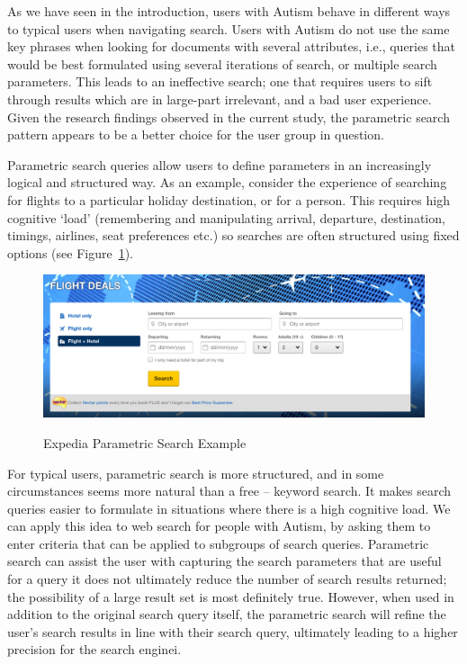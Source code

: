 \documentclass[a4paper, 11pt]{article}
\begin{document}
As we have seen in the introduction, users with Autism behave in different ways to typical users when navigating search. Users with Autism do not use the same key phrases when looking for documents with several attributes, i.e., queries that would be best formulated using several iterations of search, or multiple search parameters. This leads to an ineffective search; one that requires users to sift through results which are in large-part irrelevant, and a bad user experience. Given the research findings observed in the current study, the parametric search pattern appears to be a better choice for the user group in question.  

Parametric search queries allow users to define parameters in an increasingly logical and structured way. As an example, consider the experience of searching for flights to a particular holiday destination, or for a person. This requires high cognitive ‘load’ (remembering and manipulating arrival, departure, destination, timings, airlines, seat preferences etc.) so searches are often structured using fixed options (see Figure~\ref{exped}).

\begin{figure}[H]
\begin{center}
\includegraphics[scale=0.3]{expedia}\\

\caption{Expedia Parametric Search Example}
\label{exped}
\end{center}
\end{figure}

For typical users, parametric search is more structured, and in some circumstances seems more natural than a free – keyword search. It makes search queries easier to formulate in situations where there is a high cognitive load.  We can apply this idea to web search for people with Autism, by asking them to enter criteria that can be applied to subgroups of search queries. Parametric search can assist the user with capturing the search parameters that are useful for a query it does not ultimately reduce the number of search results returned; the possibility of a large result set is most definitely true. However, when used in addition to the original search query itself, the parametric search will refine the user’s search results in line with their search query, ultimately leading to a higher precision for the search enginei.
\end{document}
